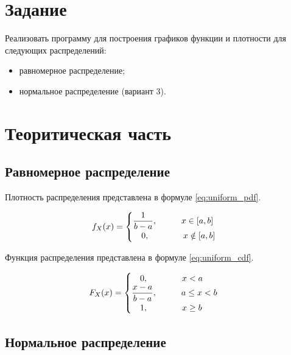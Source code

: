 \section{Задание}

\hspace*{5mm} Реализовать программу для построения графиков функции и плотности для следующих распределений:
\begin{itemize}
  \item равномерное распределение;
  \item нормальное распределение (вариант 3).
\end{itemize}


\section{Теоритическая часть}
\subsection{Равномерное распределение}

Плотность распределения представлена в формуле \ref{eq:uniform_pdf}.

\begin{equation}\label{eq:uniform_pdf}
  f_X(x) =
  \begin{cases}
    \dfrac{1}{b-a},  \hspace*{1cm} x \in [a,b] \\
    \quad 0,         \hspace*{1.4cm} x \notin [a, b] \\
  \end{cases}
\end{equation}

Функция распределения представлена в формуле \ref{eq:uniform_cdf}.

\begin{equation}\label{eq:uniform_cdf}
  F_X(x) =
  \begin{cases}
    \quad 0,         \hspace*{1.4cm} x < a \\
    \dfrac{x-a}{b-a},\hspace*{1cm} a \le x < b \\
    \quad 1,         \hspace*{1.4cm} x \geq b \\
  \end{cases}
\end{equation}

\subsection{Нормальное распределение}

